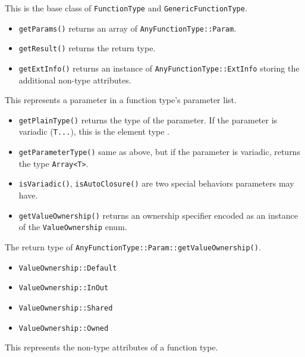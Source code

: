 \documentclass[../generics]{subfiles}
\begin{document}
This is the base class of \texttt{FunctionType} and \texttt{GenericFunctionType}.
\begin{itemize}
\item \texttt{getParams()} returns an array of \texttt{AnyFunctionType::Param}.
\item \texttt{getResult()} returns the return type.
\item \texttt{getExtInfo()} returns an instance of \texttt{AnyFunctionType::ExtInfo} storing the additional non-type attributes.
\end{itemize}

This represents a parameter in a function type's parameter list.
\begin{itemize}
\item \texttt{getPlainType()} returns the type of the parameter. If the parameter is variadic (\texttt{T...}), this is the element type \tT.
\item \texttt{getParameterType()} same as above, but if the parameter is variadic, returns the type \texttt{Array<T>}.
\item \texttt{isVariadic()}, \texttt{isAutoClosure()} are two special behaviors parameters may have.
\item \texttt{getValueOwnership()} returns an ownership specifier encoded as an instance of the \texttt{ValueOwnership} enum.
\end{itemize}

The return type of \texttt{AnyFunctionType::Param::getValueOwnership()}.
\begin{itemize}
\item \texttt{ValueOwnership::Default}
\item {}\texttt{ValueOwnership::InOut}
\item \texttt{ValueOwnership::Shared}
\item \texttt{ValueOwnership::Owned}
\end{itemize}

This represents the non-type attributes of a function type.
\end{document}
